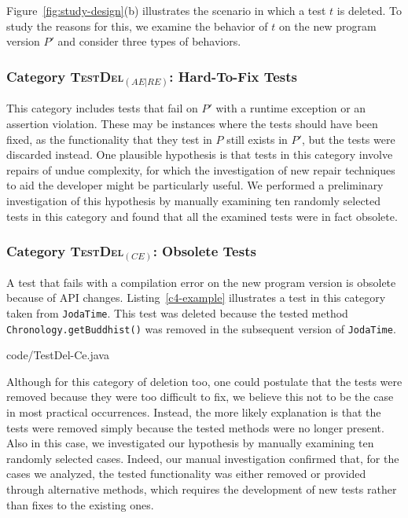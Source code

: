 \documentclass[conference]{IEEEtran}
\newcommand{\lang}[1]{\texttt{\small #1}}
\newcommand{\subject}[1]{\texttt{\small #1}}
\newcommand{\mt}{\mathit}
\newcommand{\catdelaere}{\textsc{TestDel}$_\mt{(AE|RE)}$}
\newcommand{\catdelce}{\textsc{TestDel}$_\mt{(CE)}$}
\begin{document}
Figure~\ref{fig:study-design}(b) illustrates the scenario in which a
test $t$ is deleted. To study the reasons for this, we examine the
behavior of $t$ on the new program version $P'$ and consider three
types of behaviors.

\subsubsection{Category \catdelaere{}: Hard-To-Fix Tests}
\label{sec:category-delaere}


This category includes tests that fail on $P'$ with a runtime
exception or an assertion violation. These may be instances where the
tests should have been fixed, as the functionality that they test in
$P$ still exists in $P'$, but the tests were discarded instead. One
plausible hypothesis is that tests in this category involve repairs of
undue complexity, for which the investigation of new repair techniques
to aid the developer might be particularly useful.  We performed a
preliminary investigation of this hypothesis by manually examining ten
randomly selected tests in this category and found that all the
examined tests were in fact obsolete.

\subsubsection{Category \catdelce: Obsolete Tests}
\label{sec:category-delce}

A test that fails with a compilation error on the new program version
is obsolete because of API changes. Listing~\ref{c4-example}
illustrates a test in this category taken from \subject{JodaTime}.
This test was deleted because the tested method
\lang{Chronology.getBuddhist()} was removed in the subsequent version
of \subject{JodaTime}.


{code/TestDel-Ce.java}

Although for this category of deletion too, one could postulate that
the tests were removed because they were too difficult to fix, we
believe this not to be the case in most practical occurrences.
Instead, the more likely explanation is that the tests were removed
simply because the tested methods were no longer present. Also in this
case, we investigated our hypothesis by manually examining ten
randomly selected cases. Indeed, our manual investigation confirmed
that, for the cases we analyzed, the tested functionality was either
removed or provided through alternative methods, which requires the
development of new tests rather than fixes to the existing ones.
\end{document}
